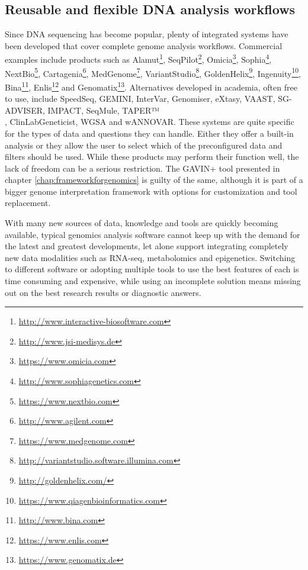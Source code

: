 \subsection{Reusable and flexible DNA analysis workflows} \label{systemsection_reusable}

Since DNA sequencing has become popular, plenty of integrated systems have been developed that cover complete genome analysis workflows.
Commercial examples include products such as Alamut\footnote{\url{http://www.interactive-biosoftware.com}}, SeqPilot\footnote{\url{http://www.jsi-medisys.de}}, Omicia\footnote{\url{https://www.omicia.com}}, Sophia\footnote{\url{http://www.sophiagenetics.com}}, NextBio\footnote{\url{https://www.nextbio.com}}, Cartagenia\footnote{\url{http://www.agilent.com}}, MedGenome\footnote{\url{https://www.medgenome.com}}, VariantStudio\footnote{\url{http://variantstudio.software.illumina.com}}, GoldenHelix\footnote{\url{http://goldenhelix.com/}}, Ingenuity\footnote{\url{https://www.qiagenbioinformatics.com}}, Bina\footnote{\url{http://www.bina.com}}, Enlis\footnote{\url{https://www.enlis.com}} and Genomatix\footnote{\url{https://www.genomatix.de}}.
Alternatives developed in academia, often free to use, include SpeedSeq\cite{Chiang_2015}, GE\-MI\-NI\cite{Paila_2013}, In\-ter\-Var\cite{Li_2017}, Ge\-no\-mi\-ser\cite{Smedley_2016}, eXtasy\cite{Sifrim_2013}, VAAST\cite{Kennedy_2014}, SG-AD\-VI\-SER\cite{Pham_2015}, IM\-PACT, Seq\-Mule\cite{Guo_2015}, TAPER™\\\cite{Glanzmann_2016}, Clin\-Lab\-Ge\-ne\-ti\-cist\cite{Wang_2015}, WGSA\cite{Liu_2015} and wAN\-NO\-VAR\cite{Chang_2012}.
These systems are quite specific for the types of data and questions they can handle.
Either they offer a built-in analysis or they allow the user to select which of the preconfigured data and filters should be used.
While these products may perform their function well, the lack of freedom can be a serious restriction.
The GAVIN+ tool presented in chapter \ref{chap:frameworkforgenomics} is guilty of the same, although it is part of a bigger genome interpretation framework with options for customization and tool replacement.

With many new sources of data, knowledge and tools are quickly becoming available, typical genomics analysis software cannot keep up with the demand for the latest and greatest developments, let alone support integrating completely new data modalities such as RNA-seq, metabolomics and epigenetics.
Switching to different software or adopting multiple tools to use the best features of each is time consuming and expensive, while using an incomplete solution means missing out on the best research results or diagnostic answers.

